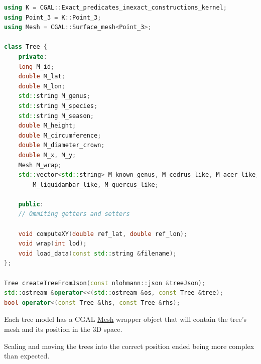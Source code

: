 \documentclass[12pt]{article}
\begin{document}
\begin{lstlisting}[language=C++]
using K = CGAL::Exact_predicates_inexact_constructions_kernel;
using Point_3 = K::Point_3;
using Mesh = CGAL::Surface_mesh<Point_3>;

class Tree {
    private:
    long M_id;
    double M_lat;
    double M_lon;
    std::string M_genus;
    std::string M_species;
    std::string M_season;
    double M_height;
    double M_circumference;
    double M_diameter_crown;
    double M_x, M_y;
    Mesh M_wrap;
    std::vector<std::string> M_known_genus, M_cedrus_like, M_acer_like,
        M_liquidambar_like, M_quercus_like;

    public:
    // Ommiting getters and setters

    void computeXY(double ref_lat, double ref_lon);
    void wrap(int lod);
    void load_data(const std::string &filename);
};

Tree createTreeFromJson(const nlohmann::json &treeJson);
std::ostream &operator<<(std::ostream &os, const Tree &tree);
bool operator<(const Tree &lhs, const Tree &rhs);
\end{lstlisting}

Each tree model has a CGAL \href{https://doc.cgal.org/latest/Surface_mesh/classCGAL_1_1Surface__mesh.html}{Mesh}
wrapper object that will contain the tree's
mesh and its position in the 3D space.

Scaling and moving the trees into the correct position ended being more complex
than expected. \\
\end{document}
